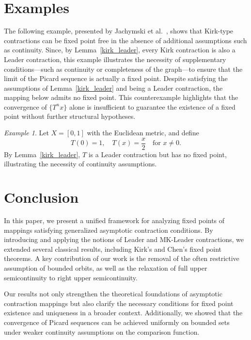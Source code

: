 \documentclass{birkjour}
\theoremstyle{definition}
\theoremstyle{remark}
\newtheorem{ex}[thm]{Example}
\numberwithin{equation}{section}
\begin{document}
\section{Examples}
The following example, presented by Jachymski et al.~\cite{jachymski2004}, shows that Kirk-type contractions can be fixed point free in the absence of additional assumptions such as continuity. Since, by Lemma~\ref{kirk_leader}, every Kirk contraction is also a Leader contraction, this example illustrates the necessity of supplementary conditions—such as continuity or completeness of the graph—to ensure that the limit of the Picard sequence is actually a fixed point. Despite satisfying the assumptions of Lemma~\ref{kirk_leader} and being a Leader contraction, the mapping below admits no fixed point. This counterexample highlights that the convergence of \(\{T^n x\}\) alone is insufficient to guarantee the existence of a fixed point without further structural hypotheses.
\begin{ex}\label{ex:counter}
Let \(X = [0,1]\) with the Euclidean metric, and define
\[
T(0) = 1, \quad T(x) = \frac{x}{2} \quad \text{for } x \neq 0.
\]
By Lemma~\ref{kirk_leader}, \(T\) is a Leader contraction but has no fixed point, illustrating the necessity of continuity assumptions.
\end{ex}






\section*{Conclusion}\label{sec:conclusion}

In this paper, we present a unified framework for analyzing fixed points of mappings satisfying generalized asymptotic contraction conditions. By introducing and applying the notions of Leader and MK-Leader contractions, we extended several classical results, including Kirk's and Chen's fixed point theorems. A key contribution of our work is the removal of the often restrictive assumption of bounded orbits, as well as the relaxation of full upper semicontinuity to right upper semicontinuity.

Our results not only strengthen the theoretical foundations of asymptotic contraction mappings but also clarify the necessary conditions for fixed point existence and uniqueness in a broader context. Additionally, we showed that the convergence of Picard sequences can be achieved uniformly on bounded sets under weaker continuity assumptions on the comparison function.
\end{document}

